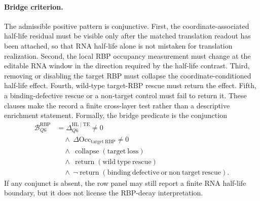 \paragraph{Bridge criterion.}
The admissible positive pattern is conjunctive.  First, the coordinate-associated half-life residual must be visible only after the matched translation readout has been attached, so that RNA half-life alone is not mistaken for translation realization.  Second, the local RBP occupancy measurement must change at the editable RNA window in the direction required by the half-life contrast.  Third, removing or disabling the target RBP must collapse the coordinate-conditioned half-life effect.  Fourth, wild-type target-RBP rescue must return the effect.  Fifth, a binding-defective rescue or a non-target control must fail to return it.  These clauses make the record a finite cross-layer test rather than a descriptive enrichment statement.  Formally, the bridge predicate is the conjunction
$$
\begin{aligned}
\mathcal{B}_{Q6}^{\mathrm{RBP}}
  &= \Delta_{Q6}^{\mathrm{HL}\mid\mathrm{TE}} \neq 0\\
  &\quad {}\wedge\ \Delta\mathrm{Occ}_{\mathrm{target\ RBP}} \neq 0\\
  &\quad {}\wedge\ \operatorname{collapse}(\mathrm{target\ loss})\\
  &\quad {}\wedge\ \operatorname{return}(\mathrm{wild\ type\ rescue})\\
  &\quad {}\wedge\ \neg\operatorname{return}(\mathrm{binding\ defective\ or\ non\ target\ rescue}).
\end{aligned}
$$
If any conjunct is absent, the row panel may still report a finite RNA half-life boundary, but it does not license the RBP-decay interpretation.

